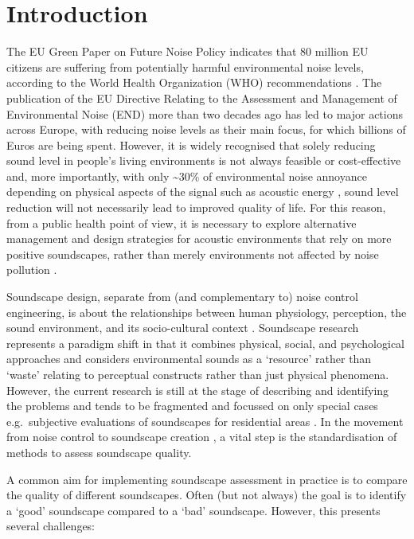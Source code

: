 \documentclass[
  authoryear,
  preprint,
  3p]{elsarticle}
\begin{document}
\section{Introduction}\label{introduction}

The EU Green Paper on Future Noise Policy indicates that 80 million EU
citizens are suffering from potentially harmful environmental noise
levels, according to the World Health Organization (WHO) recommendations
\citep{Berglund1999Guidelines}. The publication of the EU Directive
Relating to the Assessment and Management of Environmental Noise (END)
\citep{EuropeanUnion2002Directive} more than two decades ago has led to
major actions across Europe, with reducing noise levels as their main
focus, for which billions of Euros are being spent. However, it is
widely recognised that solely reducing sound level in people's living
environments is not always feasible or cost-effective and, more
importantly, with only \textasciitilde30\% of environmental noise
annoyance depending on physical aspects of the signal such as acoustic
energy \citep{Guski1997Psychological}, sound level reduction will not
necessarily lead to improved quality of life. For this reason, from a
public health point of view, it is necessary to explore alternative
management and design strategies for acoustic environments that rely on
more positive soundscapes, rather than merely environments not affected
by noise pollution
\citep{Aletta2018Associations, Kang2023Soundscape, Kang2023Supportive}.

Soundscape design, separate from (and complementary to) noise control
engineering, is about the relationships between human physiology,
perception, the sound environment, and its socio-cultural context
\citep{Kang2006Urban}. Soundscape research represents a paradigm shift
in that it combines physical, social, and psychological approaches and
considers environmental sounds as a `resource' rather than `waste'
\citep{Kang2016Soundscape} relating to perceptual constructs rather than
just physical phenomena. However, the current research is still at the
stage of describing and identifying the problems and tends to be
fragmented and focussed on only special cases e.g.~subjective
evaluations of soundscapes for residential areas
\citep{SchulteFortkamp2013Introduction, Chen2023Natural} . In the
movement from noise control to soundscape creation
\citep{Aletta2015Soundscape}, a vital step is the standardisation of
methods to assess soundscape quality.

A common aim for implementing soundscape assessment in practice is to
compare the quality of different soundscapes. Often (but not always) the
goal is to identify a `good' soundscape compared to a `bad' soundscape.
However, this presents several challenges:
\end{document}
